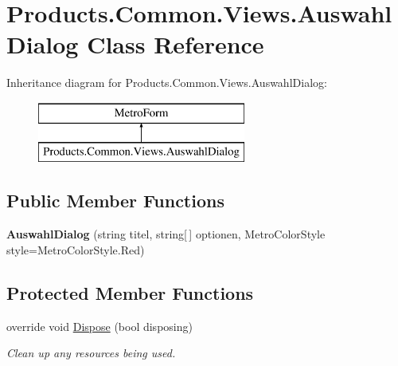 \hypertarget{class_products_1_1_common_1_1_views_1_1_auswahl_dialog}{}\section{Products.\+Common.\+Views.\+Auswahl\+Dialog Class Reference}
\label{class_products_1_1_common_1_1_views_1_1_auswahl_dialog}
Inheritance diagram for Products.\+Common.\+Views.\+Auswahl\+Dialog\+:\begin{figure}[H]
\begin{center}
\leavevmode
\includegraphics[height=2.000000cm]{class_products_1_1_common_1_1_views_1_1_auswahl_dialog}
\end{center}
\end{figure}
\subsection*{Public Member Functions}
\begin{DoxyCompactItemize}
\item 
{\bfseries Auswahl\+Dialog} (string titel, string\mbox{[}$\,$\mbox{]} optionen, Metro\+Color\+Style style=Metro\+Color\+Style.\+Red)\hypertarget{class_products_1_1_common_1_1_views_1_1_auswahl_dialog_abb59eacc992120eeb0ad4a9dcc96e108}{}\label{class_products_1_1_common_1_1_views_1_1_auswahl_dialog_abb59eacc992120eeb0ad4a9dcc96e108}

\end{DoxyCompactItemize}
\subsection*{Protected Member Functions}
\begin{DoxyCompactItemize}
\item 
override void \hyperlink{class_products_1_1_common_1_1_views_1_1_auswahl_dialog_a35e67f3dcf23b5cc83adfc13145e6494}{Dispose} (bool disposing)
\begin{DoxyCompactList}\small\item\em Clean up any resources being used. \end{DoxyCompactList}\end{DoxyCompactItemize}
